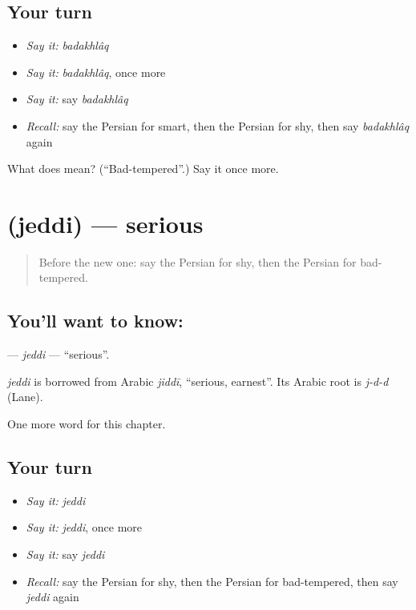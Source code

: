 \subsection*{Your turn}
\begin{itemize}
\raggedright
  \item \emph{Say it:} \emph{badakhlâq}
  \item \emph{Say it:} \emph{badakhlâq}, once more
  \item \emph{Say it:} say \emph{badakhlâq}
  \item \emph{Recall:} say the Persian for smart, then the Persian for shy, then say \emph{badakhlâq} again
\end{itemize}

\begin{tcolorbox}[breakable,colback=teal!4,colframe=teal!35!black,title={Before you move on}]
What does  mean? (\textquotedblleft{}Bad-tempered\textquotedblright{}.) Say it once more.
\end{tcolorbox}
\section[\texorpdfstring{\fa{جدی} (jeddi)}{جدی (jeddi)}]{ (jeddi) — serious}

\label{lesson:FA-C200-jeddi}



\begin{quote}
Before the new one: say the Persian for shy, then the Persian for bad-tempered.
\end{quote}

\subsection*{You'll want to know: }
\textbf{} — \emph{jeddi} — \textquotedblleft{}serious\textquotedblright{}.

\begin{cousinweb}
\emph{jeddi} is borrowed from Arabic \emph{jiddī}, \textquotedblleft{}serious, earnest\textquotedblright{}. Its Arabic root is \emph{j-d-d} (Lane).
\end{cousinweb}

\begin{grammarlens}[title={What you've built}]
One more word for this chapter.
\end{grammarlens}

\subsection*{Your turn}
\begin{itemize}
\raggedright
  \item \emph{Say it:} \emph{jeddi}
  \item \emph{Say it:} \emph{jeddi}, once more
  \item \emph{Say it:} say \emph{jeddi}
  \item \emph{Recall:} say the Persian for shy, then the Persian for bad-tempered, then say \emph{jeddi} again
\end{itemize}

